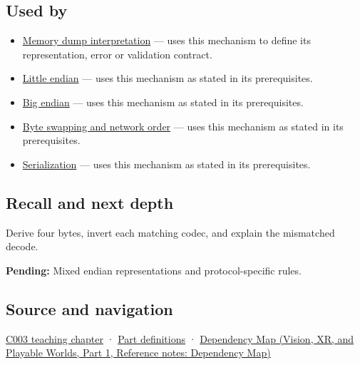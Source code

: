 \subsection{Used by}\label{appendix-bc07c3d25b18-used-by}

\hypertarget{appendix-bc07c3d25b18-used-by}{}

\begin{itemize}
\item
  \hyperref[appendix-230b59c0676b]{Memory dump interpretation} --- uses this mechanism to define its representation, error or validation contract.
\item
  \hyperref[appendix-367b6abf460e]{Little endian} --- uses this mechanism as stated in its prerequisites.
\item
  \hyperref[appendix-92e040df969a]{Big endian} --- uses this mechanism as stated in its prerequisites.
\item
  \hyperref[appendix-11ba36693aa2]{Byte swapping and network order} --- uses this mechanism as stated in its prerequisites.
\item
  \hyperref[appendix-91d09ebed979]{Serialization} --- uses this mechanism as stated in its prerequisites.
\end{itemize}

\subsection{Recall and next depth}\label{appendix-bc07c3d25b18-recall-and-next-depth}

\hypertarget{appendix-bc07c3d25b18-recall-and-next-depth}{}

Derive four bytes, invert each matching codec, and explain the mismatched decode.

\textbf{Pending:} Mixed endian representations and protocol-specific rules.

\subsection{Source and navigation}\label{appendix-bc07c3d25b18-source-and-navigation}

\hypertarget{appendix-bc07c3d25b18-source-and-navigation}{}

\hyperref[01-foundations-i-ch002-where-the-bytes-live]{C003 teaching chapter} · \hyperref[appendix-fd090d982a15-m003---parts-41-60]{Part definitions} · \href{../07-Vision-XR-and-Playable-Worlds-P01/main.pdf\#appendix-4ad47bdd269a}{Dependency Map (Vision, XR, and Playable Worlds, Part 1, Reference notes: Dependency Map)}
